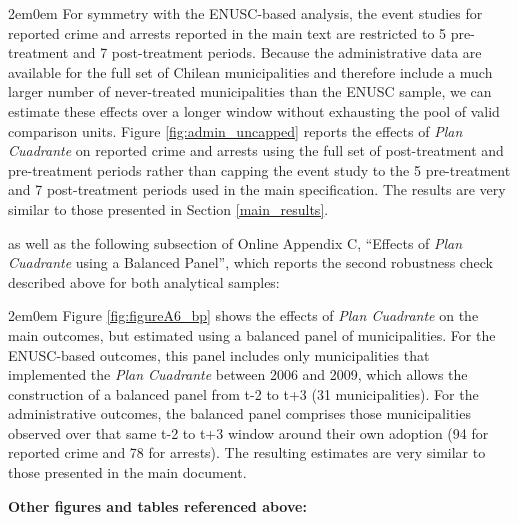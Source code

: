 \begin{adjustwidth}{2em}{0em}
For symmetry with the ENUSC-based analysis, the event studies for reported crime and arrests reported in the main text are restricted to 5 pre-treatment and 7 post-treatment periods. Because the administrative data are available for the full set of Chilean municipalities and therefore include a much larger number of never-treated municipalities than the ENUSC sample, we can estimate these effects over a longer window without exhausting the pool of valid comparison units. Figure \ref{fig:admin_uncapped} reports the effects of \emph{Plan Cuadrante} on reported crime and arrests using the full set of post-treatment and pre-treatment periods rather than capping the event study to the 5 pre-treatment and 7 post-treatment periods used in the main specification. The results are very similar to those presented in Section \ref{main_results}.
\end{adjustwidth}

as well as the following subsection of Online Appendix C, ``Effects of \emph{Plan Cuadrante} using a Balanced Panel'', which reports the second robustness check described above for both analytical samples:

\begin{adjustwidth}{2em}{0em}
Figure \ref{fig:figureA6_bp} shows the effects of \emph{Plan Cuadrante} on the main outcomes, but estimated using a balanced panel of municipalities. For the ENUSC-based outcomes, this panel includes only municipalities that implemented the \emph{Plan Cuadrante} between 2006 and 2009, which allows the construction of a balanced panel from t-2 to t+3 (31 municipalities). For the administrative outcomes, the balanced panel comprises those municipalities observed over that same t-2 to t+3 window around their own adoption (94 for reported crime and 78 for arrests). The resulting estimates are very similar to those presented in the main document.
\end{adjustwidth}

\clearpage
\noindent\textbf{Other figures and tables referenced above:}
\vspace{0.5em}

{\renewcommand{\thetable}{A.2}
}

\clearpage

{\renewcommand{\thetable}{A.3}
}

\clearpage

{\renewcommand{\thefigure}{B.1}
}

\clearpage

{\renewcommand{\thetable}{B.1}
}

\clearpage

{\renewcommand{\thefigure}{C.8}
}

\clearpage

{\renewcommand{\thefigure}{C.7}
}

\clearpage

